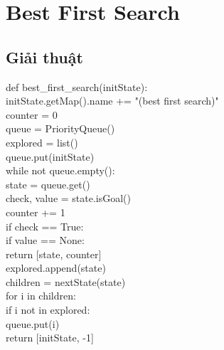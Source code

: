 \documentclass[11pt,a4paper]{article}
\begin{document}
\section{Best First Search}
\subsection{Giải thuật}
\begin{flushleft}
	\hspace{2 cm}	def best\_first\_search(initState):\\
	\hspace{3 cm}	initState.getMap().name += "(best first search)"\\
	\hspace{3 cm}	counter = 0\\
	\hspace{3 cm}	queue = PriorityQueue()\\
	\hspace{3 cm}	explored = list()\\
	\hspace{3 cm}	queue.put(initState)\\
	\hspace{3 cm}	while not queue.empty():\\
	\hspace{4 cm}	state = queue.get()\\
	\hspace{4 cm}	check, value = state.isGoal()\\
	\hspace{4 cm}	counter += 1\\
	\hspace{4 cm}	if check == True:\\
	\hspace{5 cm}	if value == None:\\
	\hspace{6 cm}	return [state, counter]\\
	\hspace{4 cm}	explored.append(state)\\
	\hspace{4 cm}	children = nextState(state)\\
	\hspace{4 cm}	for i in children:\\
	\hspace{5 cm}	if i not in explored:\\
	\hspace{6 cm}	queue.put(i)\\
	\hspace{3 cm}	return [initState, -1]\\
\end{flushleft}
\end{document}
